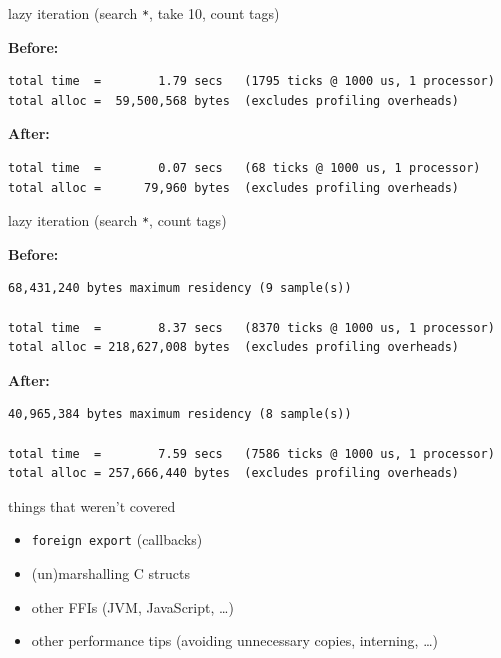 \documentclass[ignorenonframetext,aspectratio=169]{beamer}
\providecommand{\tightlist}{%
  \setlength{\itemsep}{0pt}\setlength{\parskip}{0pt}}
\begin{document}
\begin{frame}[fragile]{lazy iteration (search \texttt{*}, take 10, count
tags)}

{\bf Before:}

\begin{verbatim}
total time  =        1.79 secs   (1795 ticks @ 1000 us, 1 processor)
total alloc =  59,500,568 bytes  (excludes profiling overheads)
\end{verbatim}

{\bf After:}

\begin{verbatim}
total time  =        0.07 secs   (68 ticks @ 1000 us, 1 processor)
total alloc =      79,960 bytes  (excludes profiling overheads)
\end{verbatim}

\end{frame}

\begin{frame}[fragile]{lazy iteration (search \texttt{*}, count tags)}

{\bf Before:}

\begin{verbatim}
68,431,240 bytes maximum residency (9 sample(s))

total time  =        8.37 secs   (8370 ticks @ 1000 us, 1 processor)
total alloc = 218,627,008 bytes  (excludes profiling overheads)
\end{verbatim}

{\bf After:}

\begin{verbatim}
40,965,384 bytes maximum residency (8 sample(s))

total time  =        7.59 secs   (7586 ticks @ 1000 us, 1 processor)
total alloc = 257,666,440 bytes  (excludes profiling overheads)
\end{verbatim}

\end{frame}

\begin{frame}{things that weren't covered}
\begin{itemize}
\tightlist
\item
    \texttt{foreign export} (callbacks)
\item
  (un)marshalling C structs
\item
  other FFIs (JVM, JavaScript, \ldots)
\item
  other performance tips (avoiding unnecessary copies, interning, \ldots)
\end{itemize}
\end{frame}
\end{document}
